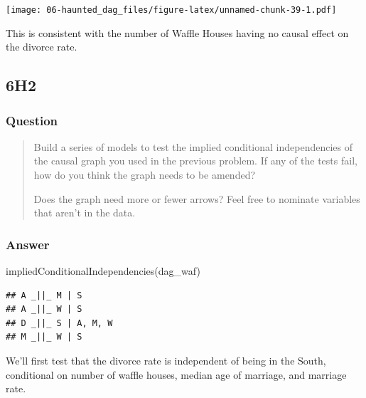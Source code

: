 \documentclass[
]{book}
\newenvironment{Shaded}{\begin{snugshade}}{\end{snugshade}}
\newcommand{\FunctionTok}[1]{\textcolor[rgb]{0.00,0.00,0.00}{#1}}
\newcommand{\NormalTok}[1]{#1}
\begin{document}
\texttt{[image: 06-haunted\_dag\_files/figure-latex/unnamed-chunk-39-1.pdf]}

This is consistent with the number of Waffle Houses having no causal effect on the divorce rate.

\hypertarget{h2-2}{%
\subsection*{6H2}\label{h2-2}}

\hypertarget{question-56}{%
\subsubsection*{Question}\label{question-56}}

\begin{quote}
Build a series of models to test the implied conditional independencies of the causal graph you used in the previous problem. If any of the tests fail, how do you think the graph needs to be amended?

Does the graph need more or fewer arrows? Feel free to nominate variables that aren't in the data.
\end{quote}

\hypertarget{answer-56}{%
\subsubsection*{Answer}\label{answer-56}}

\begin{Shaded}
\begin{Highlighting}[]
\FunctionTok{impliedConditionalIndependencies}\NormalTok{(dag\_waf)}
\end{Highlighting}
\end{Shaded}

\begin{verbatim}
## A _||_ M | S
## A _||_ W | S
## D _||_ S | A, M, W
## M _||_ W | S
\end{verbatim}

We'll first test that the divorce rate is independent of being in the South, conditional on number of waffle houses, median age of marriage, and marriage rate.
\end{document}
